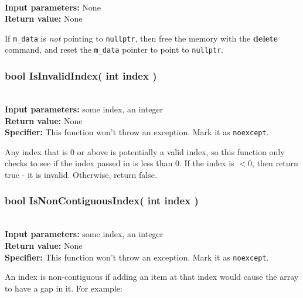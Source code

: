 \documentclass[a4paper,12pt]{book}
\begin{document}
    \begin{framed} ~\\
        \textbf{Input parameters:} None \\
        \textbf{Return value:} None
    \end{framed}

    If \texttt{m\_data} is \textit{not} pointing to \texttt{nullptr}, then
    free the memory with the \textbf{delete} command, and reset the
    \texttt{m\_data} pointer to point to \texttt{nullptr}.

    
    \newpage
    \subsubsection*{bool IsInvalidIndex( int index )}

    \begin{framed} ~\\
        \textbf{Input parameters:} some index, an integer \\
        \textbf{Return value:} None \\
        \textbf{Specifier:} This function won't throw an exception. Mark it as \texttt{noexcept}.
    \end{framed}

    Any index that is 0 or above is potentially a valid index, so this
    function only checks to see if the index passed in is less than 0.
    If the index is $< 0$, then return true - it is invalid. Otherwise,
    return false.
    
    \hrulefill
    \subsubsection*{bool IsNonContiguousIndex( int index )}

    \begin{framed} ~\\
        \textbf{Input parameters:} some index, an integer \\
        \textbf{Return value:} None \\
        \textbf{Specifier:} This function won't throw an exception. Mark it as \texttt{noexcept}.
    \end{framed}

    An index is non-contiguous if adding an item at that index would
    cause the array to have a gap in it. For example:
\end{document}
